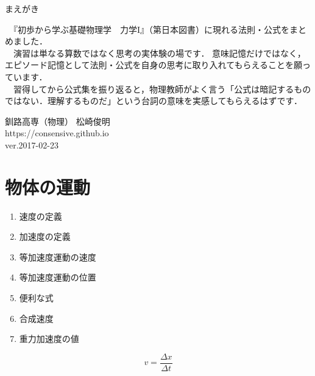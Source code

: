 \documentclass[10pt]{jarticle}
\begin{document}
\addtocounter{page}{-1}
\thispagestyle{empty}

まえがき\\

{\scriptsize
　『初歩から学ぶ基礎物理学　力学I』（第日本図書）に現れる法則・公式をまとめました．\\

　演習は単なる算数ではなく思考の実体験の場です．
意味記憶だけではなく，エピソード記憶として法則・公式を自身の思考に取り入れてもらえることを願っています．\\

　習得してから公式集を振り返ると，物理教師がよく言う「公式は暗記するものではない．理解するものだ」という台詞の意味を実感してもらえるはずです．



\vfill
\hfill 釧路高専（物理） 松崎俊明\\
\hfill https://consensive.github.io\\

\vskip-3mm \hfill ver.2017-02-23\\
}

\newpage
\addtocounter{page}{-1}
\thispagestyle{empty}
\tableofcontents



\newpage
\addtocounter{page}{-1}
\thispagestyle{empty}
\section{物体の運動}


\begin{enumerate}
\small
\itemsep-4mm
\item 速度の定義\\
\item 加速度の定義\\
\item 等加速度運動の速度\\
\item 等加速度運動の位置\\
\item 便利な式\\
\item 合成速度\\
\item 重力加速度の値
\end{enumerate}


\newpage
\[
	v = \frac{\mathit{\Delta} x}{\mathit{\Delta} t}
\]
\end{document}
